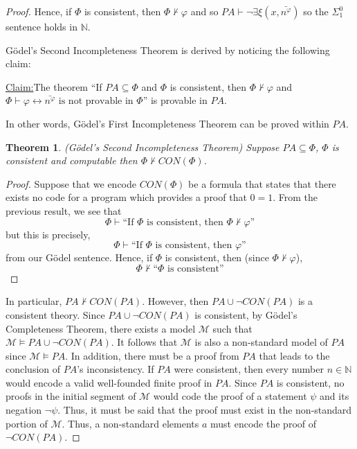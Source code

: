 \documentclass[a4paper,10pt]{article}
\newenvironment{claim}[1]{\par\noindent\underline{Claim:}\space#1}{}
\newtheorem{theorem}{Theorem}[section]
\let\phi\varphi
\newcommand*\NN{\mathbb{N}}
\newcommand*\n{\newline\par}
\newcommand*\phibar{\bar{n^{\phi}}}
\newcommand*\prf{\vdash}
\newcommand*\mo{\vDash}
\newcommand*\biject{\leftrightarrow}
\begin{document}
\begin{proof}
  Hence, if $\Phi$ is consistent, then $\Phi \not\prf \phi$ and so $PA \prf \neg\exists\xi(x,\phibar)$ so the $\Sigma_1^0$ sentence holds in $\NN$. \n

  G\"{o}del's Second Incompleteness Theorem is derived by noticing the following claim: \n
  
  \begin{claim}
    The theorem ``If $PA \subseteq \Phi$ and $\Phi$ is consistent, then $\Phi \not\prf \phi$ and $\Phi \prf \phi \biject \text{$\phibar$ is not provable in $\Phi$}$'' is provable in $PA$. 
  \end{claim} \n
  
  In other words, G\"{o}del's First Incompleteness Theorem can be proved within $PA$.
  
  \begin{theorem}
   (G\"{o}del's Second Incompleteness Theorem)
   Suppose $PA \subseteq \Phi$, $\Phi$ is consistent and computable then $\Phi \not\prf CON(\Phi)$.
  \end{theorem}

  \begin{proof}
   Suppose that we encode $CON(\Phi)$ be a formula that states that there exists no code for a program which provides a proof that $0=1$.
   From the previous result, we see that 
   \begin{equation*}
    \Phi \prf \text{``If $\Phi$ is consistent, then $\Phi \not\prf \phi$''}
   \end{equation*}
   but this is precisely,
   \begin{equation*}
    \Phi \prf \text{``If $\Phi$ is consistent, then $\phi$''}
   \end{equation*}
   from our G\"{o}del sentence.
   Hence, if $\Phi$ is consistent, then (since $\Phi \not\prf \phi$), 
      \begin{equation*}
    \Phi \not\prf \text{``$\Phi$ is consistent''}
   \end{equation*}
  \end{proof}
  
  In particular, $PA \not\prf CON(PA)$. However, then $PA \cup \neg CON(PA)$ is a consistent theory. Since $PA \cup \neg CON(PA)$ is consistent, by G\"{o}del's Completeness Theorem, there exists a model $\mathcal{M}$ such that
  $\mathcal{M} \mo PA \cup \neg CON(PA)$. It follows that $\mathcal{M}$ is also a non-standard model of $PA$ since $\mathcal{M} \mo PA$. In addition, there must be a proof from $PA$ that leads to the conclusion of $PA$'s inconsistency. If $PA$ were consistent, then every number
  $n \in \mathbb{N}$ would encode a valid well-founded finite proof in $PA$. Since $PA$ is consistent, no proofs in the initial segment of $\mathcal{M}$ would code the proof of a statement $\psi$ and its negation $\neg\psi$. Thus, it must be said that the proof must exist in the non-standard portion of $\mathcal{M}$. Thus, a non-standard elements
  $a$ must encode the proof of $\neg CON(PA)$.


\end{proof}
\end{document}
